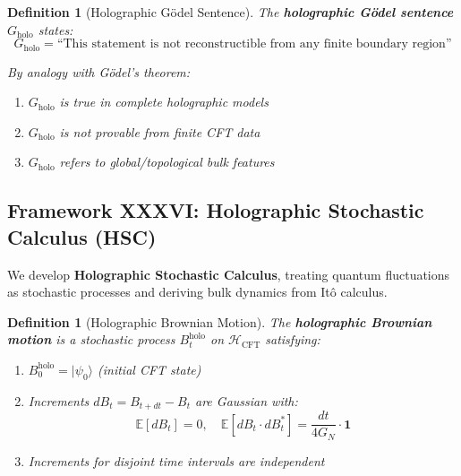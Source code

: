 \documentclass[12pt,a4paper]{article}
\newtheorem{definition}[theorem]{Definition}
\begin{document}
\begin{definition}[Holographic G\"odel Sentence]\label{def:holo-godel}
The \textbf{holographic G\"odel sentence} $G_{\text{holo}}$ states:
\begin{equation}
G_{\text{holo}} = \text{``This statement is not reconstructible from any finite boundary region''}
\end{equation}

By analogy with G\"odel's theorem:
\begin{enumerate}
    \item $G_{\text{holo}}$ is true in complete holographic models
    \item $G_{\text{holo}}$ is not provable from finite CFT data
    \item $G_{\text{holo}}$ refers to global/topological bulk features
\end{enumerate}
\end{definition}

\subsection{Framework XXXVI: Holographic Stochastic Calculus (HSC)}
\label{subsec:holographic-stochastic-calculus}

We develop \textbf{Holographic Stochastic Calculus}, treating quantum fluctuations as stochastic processes and deriving bulk dynamics from It\^o calculus.

\begin{definition}[Holographic Brownian Motion]\label{def:holo-brownian}
The \textbf{holographic Brownian motion} is a stochastic process $B_t^{\text{holo}}$ on $\mathcal{H}_{\text{CFT}}$ satisfying:
\begin{enumerate}
    \item $B_0^{\text{holo}} = |\psi_0\rangle$ (initial CFT state)
    \item Increments $dB_t = B_{t+dt} - B_t$ are Gaussian with:
    \begin{equation}
    \mathbb{E}[dB_t] = 0, \quad \mathbb{E}[dB_t \cdot dB_t^*] = \frac{dt}{4G_N} \cdot \mathbf{1}
    \end{equation}
    \item Increments for disjoint time intervals are independent
\end{enumerate}
\end{definition}
\end{document}
